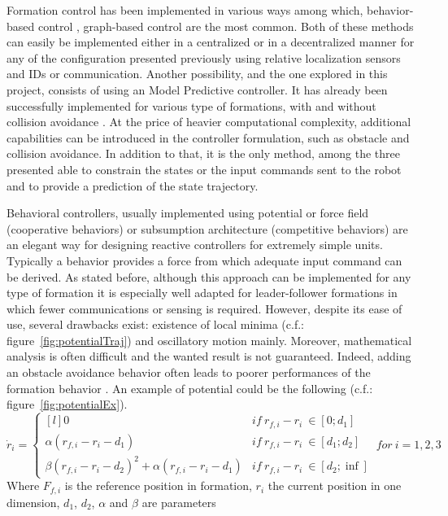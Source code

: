 \documentclass[a4paper, 12pt]{report}
\begin{document}
Formation control has been implemented in various ways among which, behavior-based control \cite{Arkin1999, Mataric2002, Pugh2009}, graph-based control  \cite{Gowal2013, Falconi2010} are the most common. Both of these methods can easily be implemented either in a centralized or in a decentralized manner for any of the configuration presented previously using relative localization sensors and IDs or communication. Another possibility, and the one explored in this project, consists of using an Model Predictive controller. It has already been successfully implemented for various type of formations, with and without collision avoidance \cite{Manikonda1999, Chao2011, Wang2007, Lim2009, Kuriki2015,Dunbar2002,Fukushima2013,Shin2009,Zhao2014,Chao2012}. At the price of heavier computational complexity, additional capabilities can be introduced in the controller formulation, such as obstacle and collision avoidance. In addition to that, it is the only method, among the three presented able to constrain the states or the input commands sent to the robot and to provide a prediction of the state trajectory.

Behavioral controllers, usually implemented using potential or force field (cooperative behaviors) \cite{Arkin1999, Pugh2009} or subsumption architecture (competitive behaviors) are an elegant way for designing reactive controllers for extremely simple units. Typically a behavior provides a force from which adequate input command can be derived. As stated before, although this approach can be implemented for any type of formation it is especially well adapted for leader-follower formations in which fewer communications or sensing is required. However, despite its ease of use, several drawbacks exist: existence of local minima (c.f.: figure~\ref{fig:potentialTraj}) and oscillatory motion mainly. Moreover, mathematical analysis is often difficult and the wanted result is not guaranteed. Indeed, adding an obstacle avoidance behavior often leads to poorer performances of the formation behavior \cite{Ren2004}. An example of potential could be the following (c.f.: figure~\ref{fig:potentialEx}).
\[ \dot r_i =  \left\{ \begin{matrix*}[l] 0 & if\ r_{f,i}-r_i\ \in [0; d_1] \\ \alpha(r_{f,i}-r_i-d_1) & if\ r_{f,i}-r_i\ \in [d_1; d_2] \\  \beta(r_{f,i}-r_i-d_2)^2 + \alpha(r_{f,i}-r_i-d_1) & if\ r_{f,i}-r_i\ \in [d_2; \inf] \end{matrix*} \right. \ for\ i = 1,2,3\]
Where $F_{f,i}$ is the reference position in formation, $r_i$ the current position in one dimension, $d_1$, $d_2$, $\alpha$ and $\beta$ are parameters
\end{document}
